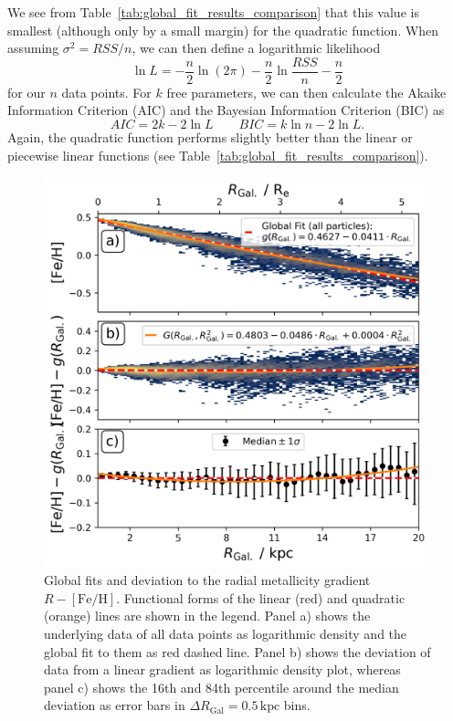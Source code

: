 \documentclass[fleqn,usenatbib]{mnras}
\begin{document}
We see from Table~\ref{tab:global_fit_results_comparison} that this value is smallest (although only by a small margin) for the quadratic function. When assuming $\sigma^2 = RSS / n$, we can then define a logarithmic likelihood
\begin{equation}
    \ln L = - \frac{n}{2} \ln (2 \pi) - \frac{n}{2} \ln \frac{RSS}{n} - \frac{n}{2}
\end{equation}
for our $n$ data points. For $k$ free parameters, we can then calculate the Akaike Information Criterion (AIC) and the Bayesian Information Criterion (BIC) as
\begin{equation} \label{eq:aic_bic}
    AIC = 2 k  - 2 \ln L \qquad BIC = k \ln n - 2 \ln L.
\end{equation}
Again, the quadratic function performs slightly better than the linear or piecewise linear functions (see Table~\ref{tab:global_fit_results_comparison}).



\begin{figure}
    \centering
    \includegraphics[width=\columnwidth]{figures/global_r_feh_fit.png}
    \caption{Global fits and deviation to the radial metallicity gradient $R-\mathrm{[Fe/H]}$. Functional forms of the linear (red) and quadratic (orange) lines are shown in the legend. Panel a) shows the underlying data of all data points as logarithmic density and the global fit to them as red dashed line. Panel b) shows the deviation of data from a linear gradient as logarithmic density plot, whereas panel c) shows the 16th and 84th percentile around the median deviation as error bars in $\Delta R_\mathrm{Gal} = 0.5\,\mathrm{kpc}$ bins.}
    \label{fig:global_r_feh_fit}
\end{figure}
\end{document}
